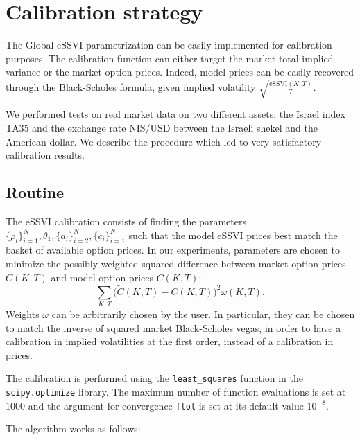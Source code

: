 \documentclass{article}
\begin{document}
	\hypertarget{calibration-strategy}{%
\section{Calibration strategy}\label{calibration-strategy}}

	The Global eSSVI parametrization can be easily implemented for
calibration purposes. The calibration function can either target the
market total implied variance or the market option prices. Indeed, model
prices can be easily recovered through the Black-Scholes formula, given
implied volatility \(\sqrt{\frac{\text{eSSVI}(K,T)}T}\).

We performed tests on real market data on two different assets: the
Israel index TA35 and the exchange rate NIS/USD between the Israeli
shekel and the American dollar. We describe the procedure which led to
very satisfactory calibration results.

	\hypertarget{routine}{%
\subsection{Routine}\label{routine}}

	The eSSVI calibration consists of finding the parameters
\(\{\rho_i\}_{i=1}^N,\theta_1,\{a_i\}_{i=2}^N,\{c_i\}_{i=1}^N\) such
that the model eSSVI prices best match the basket of available option
prices. In our experiments, parameters are chosen to minimize the
possibly weighted squared difference between market option prices
\(\tilde C(K,T)\) and model option prices \(C(K,T)\):
\[\sum_{K, T}\bigl(\tilde C(K,T)-C(K,T)\bigr)^2\omega(K,T).\] Weights
\(\omega\) can be arbitrarily chosen by the user. In particular, they
can be chosen to match the inverse of squared market Black-Scholes
vegas, in order to have a calibration in implied volatilities at the
first order, instead of a calibration in prices.

The calibration is performed using the \verb|least_squares| function in
the \verb|scipy.optimize| library. The maximum number of function
evaluations is set at \(1000\) and the argument for convergence
\verb|ftol| is set at its default value \(10^{-8}\).

	The algorithm works as follows:
\end{document}
